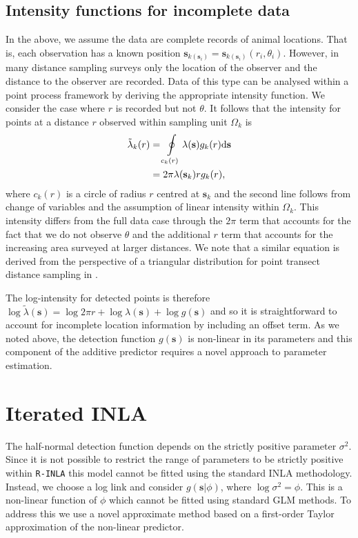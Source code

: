 \documentclass{stylefile16/statsoc}
\newcommand{\bs}{\mathbf{s}}
\newcommand{\tl}{\tilde{\lambda}}   %
\begin{document}
\subsection{Intensity functions for incomplete data}

In the above, we assume the data are complete records of animal locations.  That is, each observation has a known position $\bs_{k(\bs_i)} = \bs_{k(\bs_i)}(r_i, \theta_i)$.  However, in many distance sampling surveys only the location of the observer and the distance to the observer are recorded.  Data of this type can be analysed within a point process framework by deriving the appropriate intensity function.  We consider the case where $r$ is recorded but not $\theta$.  It follows that the intensity for points at a distance $r$ observed within sampling unit $\Omega_k$ is
\begin{align}
\label{intensity-incomplete}
\tl_k(r) &= \oint\displaylimits_{c_k(r)} \lambda(\bs)g_k(r)\mathrm{d}\bs \nonumber \\
&= 2\pi\lambda(\bs_k)rg_k(r),
\end{align}
where $c_k(r)$ is a circle of radius $r$ centred at $\bs_k$ and the second line follows from change of variables and the assumption of linear intensity within $\Omega_k$.  This intensity differs from the full data case through the $2\pi$  term that accounts for the fact that we do not observe $\theta$ and the additional $r$ term that accounts for the increasing area surveyed at larger distances.  We note that a similar equation is derived from the perspective of a triangular distribution for point transect distance sampling in \cite{buckland_advanced_2004}.  

The log-intensity for detected points is therefore $\log\tl(\bs) = \log 2 \pi r + \log\lambda(\bs) + \log g(\bs)$ and so it is straightforward to account for incomplete location information by including an offset term.  As we noted above, the detection function $g(\bs)$ is non-linear in its parameters and this component of the additive predictor requires a novel approach to parameter estimation.

\section{Iterated INLA}
\label{sec-iinla}

The half-normal detection function depends on the strictly positive parameter $\sigma^2$. Since it is not possible to restrict the range of parameters to be strictly positive within \texttt{R-INLA} this model cannot be fitted using the standard INLA methodology.  Instead, we choose a log link and consider $g(\bs | \phi)$, where $\log\sigma^2 = \phi$. This is a non-linear function of $\phi$ which cannot be fitted using standard GLM methods.  To address this we use a novel approximate method based on a first-order Taylor approximation of the non-linear predictor.  
\end{document}
